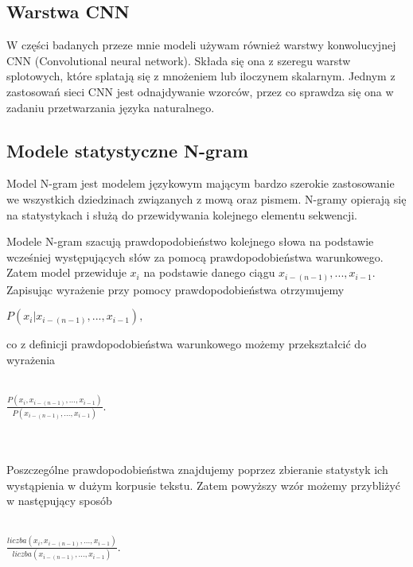 \subsection {Warstwa CNN}
W części badanych przeze mnie modeli używam również warstwy konwolucyjnej CNN (Convolutional neural network). Składa się ona 
z szeregu warstw splotowych, które splatają się z mnożeniem lub iloczynem skalarnym. Jednym z zastosowań sieci CNN jest 
odnajdywanie wzorców, przez co sprawdza się ona w zadaniu przetwarzania języka naturalnego. 

\subsection{Modele statystyczne N-gram}
Model N-gram jest modelem językowym mającym bardzo szerokie zastosowanie we wszystkich dziedzinach związanych z mową oraz pismem. 
N-gramy opierają się na statystykach i służą do przewidywania kolejnego elementu sekwencji.

Modele N-gram szacują prawdopodobieństwo kolejnego słowa na podstawie wcześniej występujących słów za pomocą
prawdopodobieństwa warunkowego. Zatem model przewiduje \begin{math}x_i\end{math} na podstawie danego ciągu 
\begin{math}x_{i-(n-1)},...,x_{i-1}\end{math}. Zapisując wyrażenie przy pomocy prawdopodobieństwa otrzymujemy \\
\centerline{\begin{math}P(x_i|x_{i-(n-1)},...,x_{i-1}),\end{math}} co z definicji prawdopodobieństwa warunkowego możemy 
przekształcić do wyrażenia\\\\ \centerline{\begin{math}\frac{P(x_i, x_{i-(n-1)},..., x_{i-1})}{P(x_{i-(n-1)},..., x_{i-1})}.\end{math}}\\\\
Poszczególne prawdopodobieństwa znajdujemy poprzez zbieranie statystyk ich wystąpienia w dużym korpusie tekstu. Zatem 
powyższy wzór możemy przybliżyć w następujący sposób\\\\
\centerline{\begin{math}\frac{liczba(x_i, x_{i-(n-1)},..., x_{i-1})}{liczba(x_{i-(n-1)},..., x_{i-1})}.\end{math}}

